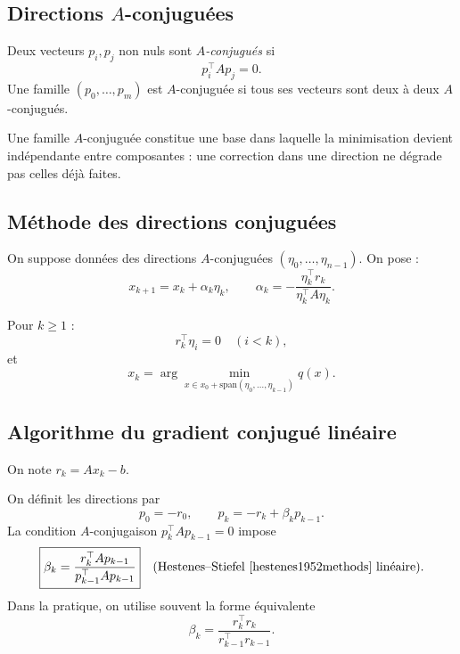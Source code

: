 \subsection{Directions \texorpdfstring{$A$}{A}-conjuguées}

\begin{definition}
Deux vecteurs $p_i,p_j$ non nuls sont \emph{$A$-conjugués} si
\[
p_i^\top A p_j = 0.
\]
Une famille $(p_0,\dots,p_m)$ est $A$-conjuguée si tous ses vecteurs sont deux à deux $A$-conjugués.
\end{definition}

Une famille $A$-conjuguée constitue une base dans laquelle la minimisation devient indépendante entre composantes : une correction dans une direction ne dégrade pas celles déjà faites.

\subsection{Méthode des directions conjuguées}

On suppose données des directions $A$-conjuguées $(\eta_0,\dots,\eta_{n-1})$. On pose :
\[
x_{k+1} = x_k + \alpha_k \eta_k, \qquad
\alpha_k = -\frac{\eta_k^\top r_k}{\eta_k^\top A \eta_k}.
\]

\begin{theoreme}
Pour $k \ge 1$ :
\[
r_k^\top \eta_i = 0 \quad (i<k),
\]
et
\[
\boxed{x_k = \arg\min_{x \in x_0 + \mathrm{span}(\eta_0,\dots,\eta_{k-1})} q(x)}.
\]
\end{theoreme}

\subsection{Algorithme du gradient conjugué linéaire}

On note $r_k = A x_k - b$.

On définit les directions par
\[
p_0 = -r_0,\qquad p_k = -r_k + \beta_k p_{k-1}.
\]
La condition $A$-conjugaison $p_k^\top A p_{k-1}=0$ impose
\[
\boxed{\beta_k = \frac{r_k^\top A p_{k-1}}{p_{k-1}^\top A p_{k-1}}}
\quad\text{(Hestenes–Stiefel \cite{hestenes1952methods} linéaire).}
\]
Dans la pratique, on utilise souvent la forme équivalente
\[
\beta_k = \frac{r_k^\top r_k}{r_{k-1}^\top r_{k-1}}.
\]

